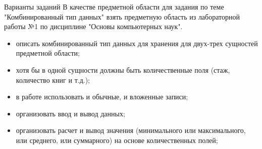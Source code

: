 \documentclass{beamer}
\begin{document}
\begin{frame}{Варианты заданий}
В качестве предметной области для задания по теме "Комбинированный тип данных"
взять предметную область из лабораторной работы №1 по дисциплине "Основы компьютерных наук".
\begin{itemize}
\item описать комбинированный тип данных для хранения для двух-трех сущностей предметной области;
\item хотя бы в одной сущности должны быть количественные поля (стаж, количество книг и т.д.);
\item в работе использовать и обычные, и вложенные записи;
\item организовать ввод и вывод данных;
\item организовать расчет и вывод значения (минимального или максимального, или среднего, или суммарного) на основе количественных полей;
\end{itemize}
\end{frame} 
\end{document}
